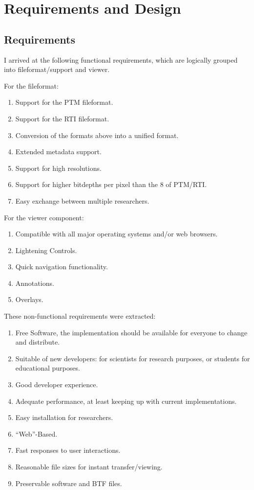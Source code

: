 \section{Requirements and Design}
\subsection{Requirements}
I arrived at the following functional requirements, which are
logically grouped into fileformat/support and viewer.

For the fileformat:
\begin{enumerate}
\item Support for the PTM\cite*{library_of_congress_polynomial_2018}  fileformat.
\item Support for the RTI\cite*{library_of_congress_reflectance_2018} fileformat.
\item Conversion of the formats above into a unified format.
\item Extended metadata support.
\item Support for high resolutions.
\item Support for higher bitdepths per pixel than the 8 of PTM/RTI.
\item Easy exchange between multiple researchers.
\end{enumerate}

For the viewer component:
\begin{enumerate}[resume]
\item Compatible with all major operating systems and/or web browsers.\label{req_system}
\item Lightening Controls.
\item Quick navigation functionality.
\item Annotations.
\item Overlays.
\end{enumerate}

These non-functional requirements were extracted:
\begin{enumerate}[resume]
\item  Free Software, the implementation should be available for everyone to
  change and distribute. \label{req_os}
\item Suitable of new developers: for scientists for research purposes,
  or students for educational purposes. \label{req_easy}
\item Good developer experience. \label{req_dx}
\item Adequate performance, at least keeping up with current
  implementations. \label{req_performance}
\item Easy installation for
  researchers. \label{req_install}
\item ``Web''-Based.
\item Fast responses to user interactions. \label{req_react}
\item Reasonable file sizes for instant transfer/viewing.
\item Preservable software and BTF files.\label{req_preserve}
\end{enumerate}

